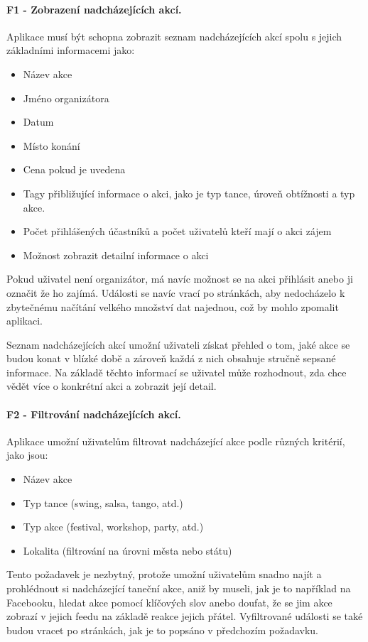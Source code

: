 \paragraph{F1 - Zobrazení nadcházejících akcí.}\label{req:F1}
Aplikace musí být schopna zobrazit seznam nadcházejících akcí spolu s jejich základními informacemi jako:
\begin{itemize}
    \item Název akce
    \item Jméno organizátora
    \item Datum
    \item Místo konání
    \item Cena pokud je uvedena
    \item Tagy přibližující informace o akci, jako je typ tance, úroveň obtížnosti a typ akce.
    \item Počet přihlášených účastníků a počet uživatelů kteří mají o akci zájem
    \item Možnost zobrazit detailní informace o akci
\end{itemize}
Pokud uživatel není organizátor, má navíc možnost se na akci přihlásit anebo ji označit že ho zajímá. Události se navíc vrací po stránkách, aby nedocházelo k zbytečnému načítání velkého množství dat najednou, což by mohlo zpomalit aplikaci.

Seznam nadcházejících akcí umožní uživateli získat přehled o tom, jaké akce se budou konat v blízké době a zároveň každá z nich obsahuje stručně sepsané informace. Na základě těchto informací se uživatel může rozhodnout, zda chce vědět více o konkrétní akci a zobrazit její detail.

\paragraph{F2 - Filtrování nadcházejících akcí.}\label{req:F2}
Aplikace umožní uživatelům filtrovat nadcházející akce podle různých kritérií, jako jsou:
\begin{itemize}
    \item Název akce
    \item Typ tance (swing, salsa, tango, atd.)
    \item Typ akce (festival, workshop, party, atd.)
    \item Lokalita (filtrování na úrovni města nebo státu)
\end{itemize}
Tento požadavek je nezbytný, protože umožní uživatelům snadno najít a prohlédnout si nadcházející taneční akce, aniž by museli, jak je to například na Facebooku, hledat akce pomocí klíčových slov anebo doufat, že se jim akce zobrazí v jejich feedu na základě reakce jejich přátel. Vyfiltrované události se také budou vracet po stránkách, jak je to popsáno v předchozím požadavku.

